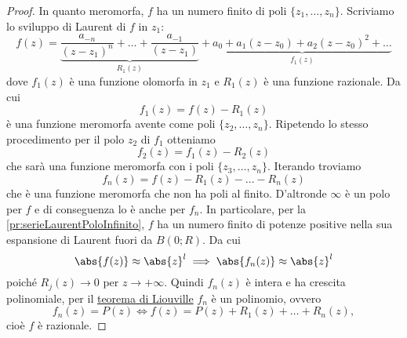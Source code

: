 \begin{proof}
	In quanto meromorfa, \(f\) ha un numero finito di poli \(\{z_1,\ldots, z_n\}\).
	Scriviamo lo sviluppo di Laurent di \(f\) in \(z_1\):
	\[
		f(z) = \underbrace{\frac{a_{-n}}{(z-z_1)^n}+\ldots+ \frac{a_{-1}}{(z-z_1)}}_{R_1(z)} + \underbrace{a_0 + a_1 (z-z_0) + a_2(z-z_0)^2 + \ldots}_{f_1(z)}
	\]
	dove \(f_1(z)\) è una funzione olomorfa in \(z_1\) e \(R_1(z)\) è una funzione razionale.
	Da cui
	\[
		f_1(z) = f(z) -R_1(z)
	\]
	è una funzione meromorfa avente come poli \(\{z_2,\ldots,z_n\}\).
	Ripetendo lo stesso procedimento per il polo \(z_2\) di \(f_1\) otteniamo
	\[
		f_2(z) = f_1(z) - R_2(z)
	\]
	che sarà una funzione meromorfa con i poli \(\{z_3,\ldots,z_n\}\).
	Iterando troviamo
	\[
		f_n(z) = f(z) - R_1(z) - \ldots - R_n(z)
	\]
	che è una funzione meromorfa che non ha poli al finito.
	D'altronde \(\infty\) è un polo per \(f\) e di conseguenza lo è anche per \(f_n\).
	In particolare, per la \autoref{pr:serieLaurentPoloInfinito}, \(f\) ha un numero finito di potenze positive nella sua espansione di Laurent fuori da \(B(0;R)\).
	Da cui
	\[
		\abs{f(z)} \approx \abs{z}^l \implies \abs{f_n(z)} \approx \abs{z}^l
	\]
	poiché \(R_j(z) \to 0\) per \(z \to +\infty\).
	Quindi \(f_n(z)\) è intera e ha crescita polinomiale, per il \hyperref[th:teoremaLiouvilleGeneralizzato]{teorema di Liouville} \(f_n\) è un polinomio, ovvero
	\[
		f_n(z) = P(z) \iff f(z) = P(z)+R_1(z) + \ldots +R_n(z),
	\]
	cioè \(f\) è razionale.
\end{proof}
